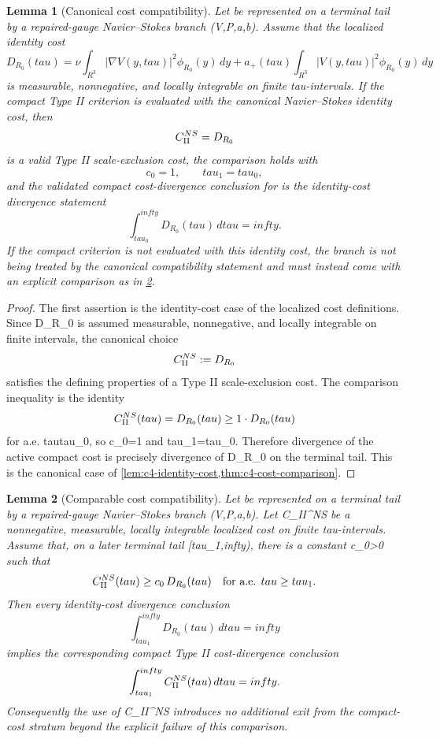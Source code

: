 \documentclass[11pt]{amsart}
\def\({}%
\def\){}%
\def\tilde#1{#1}%
\def\mathfrak#1{#1}%
\def\mathbb#1{#1}%
\def\tau{tau}%
\def\infty{infty}%
\theoremstyle{plain}
\newtheorem{lemma}[lemma]{Lemma}
\theoremstyle{definition}
\theoremstyle{remark}
\begin{document}
\begin{lemma}[Canonical cost compatibility]
\label{paper7:lem:canonical-cost-compatibility}
Let \(\omega\) be represented on a terminal tail by a repaired-gauge
Navier--Stokes branch \((V,P,a,b)\).  Assume that the localized identity cost
\[
  \tilde{\mathfrak D}_{R_0}(\tau)
  =
  \nu\int_{\mathbb R^3}|\nabla V(y,\tau)|^2\phi_{R_0}(y)\,dy
  +
  a_+(\tau)\int_{\mathbb R^3}|V(y,\tau)|^2\phi_{R_0}(y)\,dy
\]
is measurable, nonnegative, and locally integrable on finite
\(\tau\)-intervals.  If the compact Type II criterion is evaluated with the
canonical Navier--Stokes identity cost, then
\[
  \mathfrak C_{\rm II}^{NS}=\tilde{\mathfrak D}_{R_0}
\]
is a valid Type II scale-exclusion cost, the comparison holds with
\[
  c_0=1,\qquad \tau_1=\tau_0,
\]
and the validated compact cost-divergence conclusion for \(\omega\) is the
identity-cost divergence statement
\[
  \int_{\tau_0}^{\infty}
  \tilde{\mathfrak D}_{R_0}(\tau)\,d\tau=\infty .
\]
If the compact criterion is not evaluated with this identity cost, the branch
is not being treated by the canonical compatibility statement and must instead
come with an explicit comparison as in
\cref{paper7:lem:comparable-cost-compatibility}.
\end{lemma}

\begin{proof}
The first assertion is the identity-cost case of the localized cost
definitions.  Since
\(\tilde{\mathfrak D}_{R_0}\) is assumed measurable, nonnegative, and
locally integrable on finite intervals, the canonical choice
\[
  \mathfrak C_{\rm II}^{NS}:=\tilde{\mathfrak D}_{R_0}
\]
satisfies the defining properties of a Type II scale-exclusion cost.  The
comparison inequality is the identity
\[
  \mathfrak C_{\rm II}^{NS}(\tau)
  =
  \tilde{\mathfrak D}_{R_0}(\tau)
  \ge
  1\cdot\tilde{\mathfrak D}_{R_0}(\tau)
\]
for a.e. \(\tau\ge\tau_0\), so \(c_0=1\) and \(\tau_1=\tau_0\).  Therefore
divergence of the active compact cost is precisely divergence of
\(\tilde{\mathfrak D}_{R_0}\) on the terminal tail.  This is the
canonical case of \cref{lem:c4-identity-cost,thm:c4-cost-comparison}.
\end{proof}

\begin{lemma}[Comparable cost compatibility]
\label{paper7:lem:comparable-cost-compatibility}
Let \(\omega\) be represented on a terminal tail by a repaired-gauge
Navier--Stokes branch \((V,P,a,b)\).  Let
\(\mathfrak C_{\rm II}^{NS}\) be a nonnegative, measurable, locally integrable
localized cost on finite \(\tau\)-intervals.  Assume that, on a later terminal
tail \([\tau_1,\infty)\), there is a constant \(c_0>0\) such that
\[
  \mathfrak C_{\rm II}^{NS}(\tau)
  \ge
  c_0\,\tilde{\mathfrak D}_{R_0}(\tau)
  \quad\text{for a.e. }\tau\ge\tau_1 .
\]
Then every identity-cost divergence conclusion
\[
  \int_{\tau_1}^{\infty}
  \tilde{\mathfrak D}_{R_0}(\tau)\,d\tau=\infty
\]
implies the corresponding compact Type II cost-divergence conclusion
\[
  \int_{\tau_1}^{\infty}
  \mathfrak C_{\rm II}^{NS}(\tau)\,d\tau=\infty .
\]
Consequently the use of \(\mathfrak C_{\rm II}^{NS}\) introduces no additional
exit from the compact-cost stratum beyond the explicit failure of this
comparison.
\end{lemma}
\end{document}
